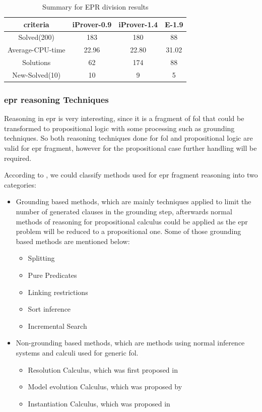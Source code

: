 \begin{table}[H]
	\centering
	\begin{tabular}{||c | c | c | c||} 
 		\hline
		criteria & iProver-0.9 & iProver-1.4 & E-1.9 \\ %
 		\hline\hline
		Solved(200) & 183 & 180 & 88 \\
		Average-CPU-time & 22.96 & 22.80 & 31.02 \\
		Solutions & 62 & 174 & 88 \\
		New-Solved(10) & 10 & 9 & 5 \\ [1ex] 
 		\hline
		\end{tabular}
	\caption{Summary for EPR division results}
	\label{table:epr_casc_results}
\end{table}




\subsubsection{\ac{epr} reasoning Techniques}
Reasoning in \ac{epr} is very interesting, since it is a fragment of \ac{fol} that could be transformed to propositional logic with some processing such as grounding techniques. So both reasoning techniques done for \ac{fol} and propositional logic are valid for \ac{epr} fragment, however for the propositional case further handling will be required.


According to \cite{EPR_PHD}, we could classify methods used for \ac{epr} fragment reasoning into two categories:
	\begin{itemize}
		\item Grounding based methods, which are mainly techniques applied to limit the number of generated clauses in the grounding step, afterwards normal methods of reasoning for propositional calculus could be applied as the \ac{epr} problem will be reduced to a propositional one. Some of those grounding based methods are mentioned below: 
			\begin{itemize}
				\item Splitting
				\item Pure Predicates
				\item Linking restrictions
				\item Sort inference
				\item Incremental Search			
			\end{itemize}
		\item Non-grounding based methods, which are methods using normal inference systems and calculi used for generic \ac{fol}.
			\begin{itemize}
				\item Resolution Calculus, which was first proposed in \cite{ROB65}
				\item Model evolution Calculus, which was proposed by \cite{MOD03}  
				\item Instantiation Calculus, which was proposed in \cite{INST03}
			\end{itemize} 
	\end{itemize}		

